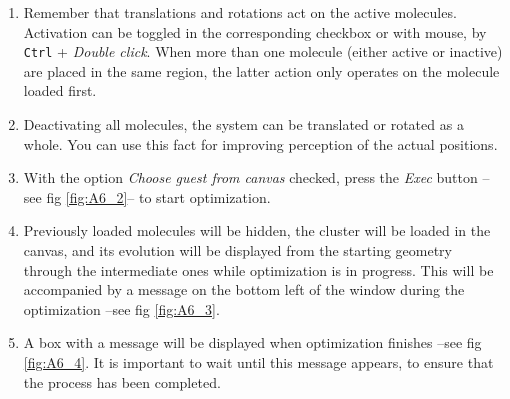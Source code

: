 \documentclass[10pt]{article}
\begin{document}
\begin{enumerate}
\item Remember that translations and rotations act on the active molecules.
Activation can be toggled in the corresponding checkbox or with mouse, by
\texttt{Ctrl} + {\it Double click}.  When more than one molecule 
(either active or inactive) are placed in the same region, the latter action
only operates on the molecule loaded first.

\item Deactivating all molecules, the system can be translated or rotated as
a whole. You can use this fact for improving perception of the actual 
positions.

\item With the option {\it Choose guest from canvas} checked, press
the {\it Exec} button  --see fig \ref{fig:A6_2}-- to start optimization.

\item Previously loaded molecules will be hidden, the cluster 
will be loaded in the canvas, and its evolution will be
displayed from the starting geometry through the intermediate ones
while optimization is in progress. This will be accompanied by
a message on the bottom left of the window during the optimization
--see fig \ref{fig:A6_3}.

\item A box with a message will be displayed when optimization finishes
--see fig \ref{fig:A6_4}.
It is important to wait until this message appears, to ensure that
the process has been completed.


\end{enumerate}
\end{document}
